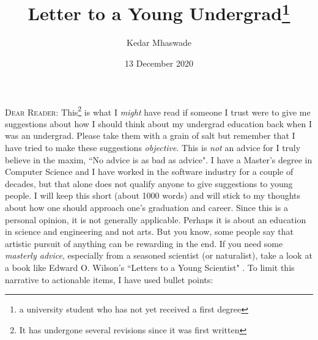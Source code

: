 \documentclass[a6paper]{article}
\begin{document}
\title{Letter to a Young Undergrad\footnote{a university student who has not yet received a first degree}}
\date{13 December 2020}
\author{Kedar Mhaswade}
\maketitle
\lettrine[lines=3]{D}{ear Reader}: This\footnote{It has undergone several revisions since it was first written} is what I \emph{might} have read if someone I trust were to give me suggestions about how I should think about my undergrad education back when I was an undergrad. Please take them with a grain of salt but remember that I have tried to make these suggestions \emph{objective}. This is \emph{not} an advice for I truly believe in the maxim, ``No advice is as bad as advice". I have a Master's degree in Computer Science and I have worked in the software industry for a couple of decades, but that alone does not qualify anyone to give suggestions to young people. I will keep this short (about 1000 words) and will stick to my thoughts about how one should approach one's graduation and career. Since this is a personal opinion, it is not generally applicable. Perhaps it is about an education in science and engineering and not arts. But you know, some people say that artistic pursuit of anything can be rewarding in the end. If you need some \emph{masterly advice}, especially from a seasoned scientist (or naturalist), take a look at a book like Edward O. Wilson's ``Letters to a Young Scientist" \cite{letters}. To limit this narrative to actionable items, I have used bullet points:
\end{document}
